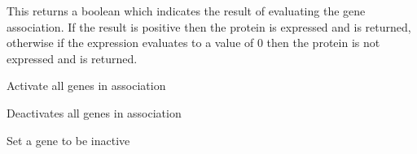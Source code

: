 \documentclass[letterpaper,10pt,english]{sphinxmanual}
\begin{document}
\begin{fulllineitems}

\begin{fulllineitems}
\label{\detokenize{modules_doc:cbmpy.CBModel.GeneProteinAssociation.isProteinActive}}
\pysigstartsignatures
{}
\pysigstopsignatures
\sphinxAtStartPar
This returns a boolean which indicates the result of evaluating the gene association. If the result is positive
then the protein is expressed and  is returned, otherwise if the expression evaluates to a value of 0 then
the protein is not expressed and   is returned.

\end{fulllineitems}


\begin{fulllineitems}
\label{\detokenize{modules_doc:cbmpy.CBModel.GeneProteinAssociation.setAllGenesActive}}
\pysigstartsignatures
{}
\pysigstopsignatures
\sphinxAtStartPar
Activate all genes in association

\end{fulllineitems}


\begin{fulllineitems}
\label{\detokenize{modules_doc:cbmpy.CBModel.GeneProteinAssociation.setAllGenesInactive}}
\pysigstartsignatures
{}
\pysigstopsignatures
\sphinxAtStartPar
Deactivates all genes in association

\end{fulllineitems}


\begin{fulllineitems}
\label{\detokenize{modules_doc:cbmpy.CBModel.GeneProteinAssociation.setGeneActive}}
\pysigstartsignatures
{}
\pysigstopsignatures
\sphinxAtStartPar
Set a gene to be inactive


\end{fulllineitems}
\end{fulllineitems}
\end{document}
